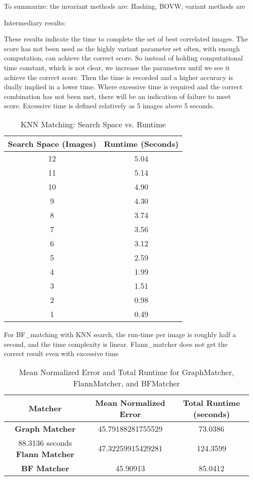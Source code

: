 To summarize: the invariant methods are: Hashing, BOVW; variant methods are 



Intermediary results:

These results indicate the time to complete the set of best correlated images. The score has not been used as the highly variant parameter set often, with enough computation, can achieve the correct score. So instead of holding computational time constant, which is not clear, we increase the parameters until we see it achieve the correct score. Then the time is recorded and a higher accuracy is dually implied in a lower time. Where excessive time is required and the correct combination has not been met, there will be an indication of failure to meet score. 
Excessive time is defined relatively as 5 images above 5 seconds. 

\begin{table}[H]
    \centering
    \begin{tabular}{|c|c|}
    \hline
    \textbf{Search Space (Images)} & \textbf{Runtime (Seconds)} \\ \hline
    12  & 5.04 \\ \hline
    11  & 5.14 \\ \hline
    10  & 4.90 \\ \hline
    9   & 4.30 \\ \hline
    8   & 3.74 \\ \hline
    7   & 3.56 \\ \hline
    6   & 3.12 \\ \hline
    5   & 2.59 \\ \hline
    4   & 1.99 \\ \hline
    3   & 1.51 \\ \hline
    2   & 0.98 \\ \hline
    1   & 0.49 \\ \hline
    \end{tabular}
    \caption{KNN Matching: Search Space vs. Runtime}
    \end{table}

For BF\_matching with KNN search, the run-time per image is roughly half a second, and the time complexity is linear.   
Flann\_matcher does not get the correct result even with excessive time


\begin{table}[H]
    \centering
    \begin{tabular}{|c|c|c|}
    \hline
    \textbf{Matcher} & \textbf{Mean Normalized Error} & \textbf{Total Runtime (seconds)} \\ \hline
    \textbf{Graph Matcher} & 45.79188281755529 & 73.0386 \\ \hline 88.3136 seconds
    \textbf{Flann Matcher} & 47.32259915429281 & 124.3599 \\ \hline
    \textbf{BF Matcher} & 45.90913 & 85.0412 \\ \hline
    \end{tabular}
    \caption{Mean Normalized Error and Total Runtime for GraphMatcher, FlannMatcher, and BFMatcher}
\end{table}
    
